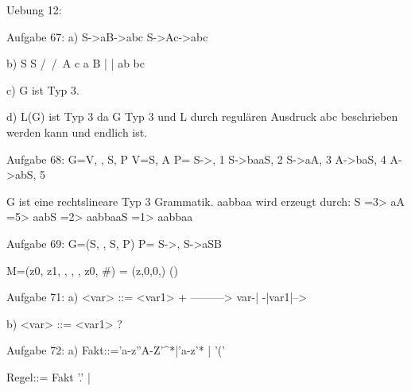 Uebung 12:

Aufgabe 67:
a)
S->aB->abc
S->Ac->abc

b)
  S		S
  /\	/\
  A c	a B
  |		  |
 ab		  bc
 
c)
G ist Typ 3.

d)
L(G) ist Typ 3 da G Typ 3 und L
durch regulären Ausdruck abc beschrieben werden kann und endlich ist.


Aufgabe 68:
G={V, \sigma, S, P}
V={S, A}
P={
S->\epsilon,	1
S->baaS,		2
S->aA,			3
A->baS,			4
A->abS,			5
}

G ist eine rechtslineare Typ 3 Grammatik.
aabbaa wird erzeugt durch:
S =3> aA =5> aabS =2> aabbaaS =1> aabbaa


Aufgabe 69:
G=(S, \Sigma, S, P)
P={
S->\epsilon,
S->aSB
}

M=({z0, z1}, \Sigma, \Gamma, \Delta, z0, #)
\Delta ={
(z,0,0,\epsilon)
()
}


Aufgabe 71:
a) <var> ::= <var1> +
	 --------->
var-|
     -|var1|-->

b) <var> ::= <var1> ?


Aufgabe 72:
a)
Fakt::='a-z''A-Z'^*|'a-z'* | '(' 

Regel::= Fakt '.' | 